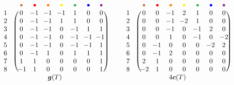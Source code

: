 \(
\begin{blockarray}{ccccccccc}
	& & {\color{brown} \bullet} & {\color{red} \bullet} & {\color{orange} \bullet} & {\color{yellow} \bullet} & {\color{green} \bullet} & {\color{blue} \bullet} & {\color{violet} \bullet} \\
	\begin{block}{c@{\hspace*{-.1cm}}c(ccccccc)}
	1 & & 0 & \!\! -1 \!\! & \!\! -1 \!\! & \!\! -1 \!\! & 1 & 0 & 0 \\
	2 & & 0 & \!\! -1 \!\! & \!\! -1 \!\! & 1 & 1 & 0 & 0 \\
	3 & & 0 & \!\! -1 \!\! & \!\! -1 \!\! & 0 & \!\! -1 \!\! & 1 & 1 \\
	4 & & 0 & \!\! -1 \!\! & \!\! -1 \!\! & 0 & \!\! -1 \!\! & \!\! -1 \!\! & \!\!\! -1 \! \\
	5 & & 0 & \!\! -1 \!\! & \!\! -1 \!\! & 0 & \!\! -1 \!\! & \!\! -1 \!\! & 1 \\
	6 & & 0 & \!\! -1 \!\! & 1 & 0 & 1 & 1 & 1 \\
	7 & & 1 & 1 & 0 & 0 & 0 & 0 & 1 \\
	8 & & \! -1 \!\!\! & 1 & 0 & 0 & 0 & 0 & 1 \\
	\end{block}
	& & & & \multicolumn{2}{c}{$\b{g}(T)$} & &
\end{blockarray}
%
\qquad
%
\begin{blockarray}{ccccccccc}
	& & {\color{brown} \bullet} & {\color{red} \bullet} & {\color{orange} \bullet} & {\color{yellow} \bullet} & {\color{green} \bullet} & {\color{blue} \bullet} & {\color{violet} \bullet} \\
	\begin{block}{c@{\hspace*{-.1cm}}c(ccccccc)}
	1 & & 0 & 0 & \!\! -1 \!\! & 2 & 1 & 0 & 0 \\
	2 & & 0 & 0 & \!\! -1 \!\! & \!\! -2 \!\! & 1 & 0 & 0 \\
	3 & & 0 & 0 & \!\! -1 \!\! & 0 & \!\! -1 \!\! & 2 & 0 \\
	4 & & 0 & 0 & 1 & 0 & \!\! -1 \!\! & 0 & \!\! -2 \!\! \\
	5 & & 0 & \!\! -1 \!\! & 0 & 0 & 0 & \!\! -2 \!\! & 2 \\
	6 & & 0 & \!\! -1 \!\! & 2 & 0 & 0 & 0 & 0 \\
	7 & & 2 & 1 & 0 & 0 & 0 & 0 & 0 \\
	8 & & \! -2 \!\!\! & 1 & 0 & 0 & 0 & 0 & 0 \\
	\end{block}
	& & & & \multicolumn{2}{c}{$4\b{c}(T)$} & &
\end{blockarray}
\)